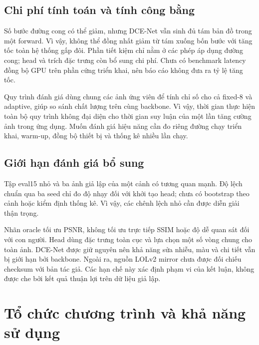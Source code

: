 \subsection{Chi phí tính toán và tính công bằng}
Số bước đường cong có thể giảm, nhưng DCE-Net vẫn sinh đủ tám bản đồ trong một forward. Vì vậy, không thể đồng nhất giảm từ tám xuống bốn bước với tăng tốc toàn hệ thống gấp đôi. Phần tiết kiệm chỉ nằm ở các phép áp dụng đường cong; head và trích đặc trưng còn bổ sung chi phí. Chưa có benchmark latency đồng bộ GPU trên phần cứng triển khai, nên báo cáo không đưa ra tỷ lệ tăng tốc.

Quy trình đánh giá dùng chung các ảnh ứng viên để tính chỉ số cho cả fixed-8 và adaptive, giúp so sánh chất lượng trên cùng backbone. Vì vậy, thời gian thực hiện toàn bộ quy trình không đại diện cho thời gian suy luận của một lần tăng cường ảnh trong ứng dụng. Muốn đánh giá hiệu năng cần đo riêng đường chạy triển khai, warm-up, đồng bộ thiết bị và thống kê nhiều lần chạy.

\subsection{Giới hạn đánh giá bổ sung}
Tập eval15 nhỏ và ba ảnh giả lập của một cảnh có tương quan mạnh. Độ lệch chuẩn qua ba seed chỉ đo độ nhạy đối với khởi tạo head; chưa có bootstrap theo cảnh hoặc kiểm định thống kê. Vì vậy, các chênh lệch nhỏ cần được diễn giải thận trọng.

Nhãn oracle tối ưu PSNR, không tối ưu trực tiếp SSIM hoặc độ dễ quan sát đối với con người. Head dùng đặc trưng toàn cục và lựa chọn một số vòng chung cho toàn ảnh. DCE-Net được giữ nguyên nên khả năng sửa nhiễu, màu và chi tiết vẫn bị giới hạn bởi backbone. Ngoài ra, nguồn LOLv2 mirror chưa được đối chiếu checksum với bản tác giả. Các hạn chế này xác định phạm vi của kết luận, không được che bởi kết quả thuận lợi trên dữ liệu giả lập.

\section{Tổ chức chương trình và khả năng sử dụng}
